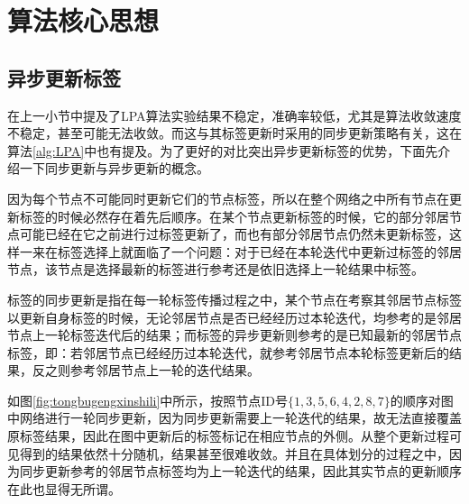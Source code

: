 \section{算法核心思想}

\subsection{异步更新标签}

在上一小节中提及了LPA算法实验结果不稳定，准确率较低，尤其是算法收敛速度不稳定，甚至可能无法收敛。而这与其标签更新时采用的同步更新策略有关，这在算法\ref{alg:LPA}中也有提及。为了更好的对比突出异步更新标签的优势，下面先介绍一下同步更新与异步更新的概念。

因为每个节点不可能同时更新它们的节点标签，所以在整个网络之中所有节点在更新标签的时候必然存在着先后顺序。在某个节点更新标签的时候，它的部分邻居节点可能已经在它之前进行过标签更新了，而也有部分邻居节点仍然未更新标签，这样一来在标签选择上就面临了一个问题：对于已经在本轮迭代中更新过标签的邻居节点，该节点是选择最新的标签进行参考还是依旧选择上一轮结果中标签。

标签的同步更新是指在每一轮标签传播过程之中，某个节点在考察其邻居节点标签以更新自身标签的时候，无论邻居节点是否已经经历过本轮迭代，均参考的是邻居节点上一轮标签迭代后的结果；而标签的异步更新则参考的是已知最新的邻居节点标签，即：若邻居节点已经经历过本轮迭代，就参考邻居节点本轮标签更新后的结果，反之则参考邻居节点上一轮的迭代结果。

如图\ref{fig:tongbugengxinshili}中所示，按照节点ID号$\{1,3,5,6,4,2,8,7 \} $的顺序对图中网络进行一轮同步更新，因为同步更新需要上一轮迭代的结果，故无法直接覆盖原标签结果，因此在图中更新后的标签标记在相应节点的外侧。从整个更新过程可见得到的结果依然十分随机，结果甚至很难收敛。并且在具体划分的过程之中，因为同步更新参考的邻居节点标签均为上一轮迭代的结果，因此其实节点的更新顺序在此也显得无所谓。


